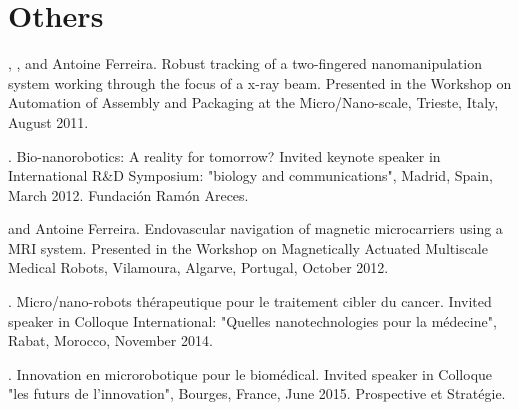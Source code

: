 \section{Others}

\begin{Mybibliography}{10}
  \NAmari, \DavidFolio, and Antoine Ferreira.
  \newblock Robust tracking of a two-fingered nanomanipulation system working
  through the focus of a x-ray beam.
  \newblock Presented in the Workshop on Automation of Assembly and Packaging at
  the Micro/Nano-scale, Trieste, Italy, August 2011.
  
  \DavidFolio.
  \newblock Bio-nanorobotics: A reality for tomorrow?
  \newblock Invited keynote speaker in International R\&D Symposium: "biology and
  communications", Madrid, Spain, March 2012.
  \newblock Fundación Ramón Areces.
  
  
  \DavidFolio and Antoine Ferreira.
  \newblock Endovascular navigation of magnetic microcarriers using a {MRI}
  system.
  \newblock Presented in the Workshop on Magnetically Actuated Multiscale Medical
  Robots, Vilamoura, Algarve, Portugal, October 2012.
  
  \DavidFolio.
  \newblock Micro/nano-robots thérapeutique pour le traitement cibler du cancer.
  \newblock Invited speaker in Colloque International: "Quelles nanotechnologies
  pour la m\'edecine", Rabat, Morocco, November 2014.
  
  \DavidFolio.
  \newblock Innovation en microrobotique pour le biomédical.
  \newblock Invited speaker in Colloque "les futurs de l'innovation", Bourges, France, June 2015.
  \newblock Prospective et Stratégie.
\end{Mybibliography}
  